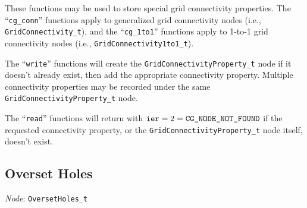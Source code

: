 These functions may be used to store special grid connectivity properties.
The ``\texttt{cg\_conn}'' functions apply to generalized grid
connectivity nodes (i.e., \texttt{GridConnectivity\_t}), and the
``\texttt{cg\_1to1}'' functions apply to 1-to-1 grid connectivity nodes
(i.e., \texttt{GridConnectivity1to1\_t}).

The ``\texttt{write}'' functions will create the
\texttt{GridConnectivityProperty\_t} node if it doesn't already exist,
then add the appropriate connectivity property.
Multiple connectivity properties may be recorded under the same
\texttt{GridConnectivityProperty\_t} node.

The ``\texttt{read}'' functions will return with $\text{\texttt{ier}} = 2 =
\text{\texttt{CG\_NODE\_NOT\_FOUND}}$ if the requested connectivity property,
or the \texttt{GridConnectivityProperty\_t} node itself, doesn't exist.

\newpage
\subsection{Overset Holes}
\label{s:overset}

\noindent
\textit{Node}: \texttt{OversetHoles\_t}

